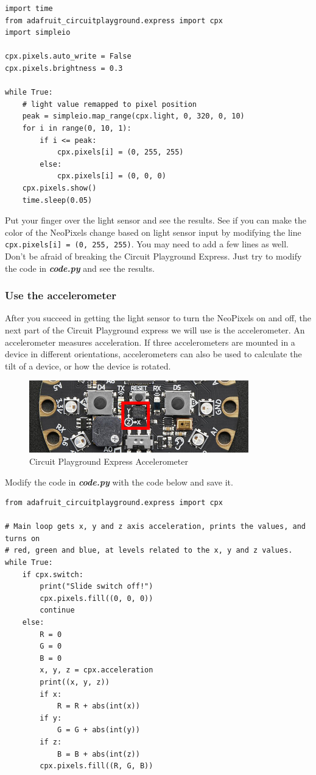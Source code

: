 \documentclass[11pt]{article}
\makeatletter
\def\maxwidth{\ifdim\Gin@nat@width>\linewidth\linewidth
    \else\Gin@nat@width\fi}
\let\Oldincludegraphics\includegraphics
\renewcommand{\includegraphics}[1]{\Oldincludegraphics[width=.8\maxwidth]{#1}}
\makeatother
\begin{document}
\begin{verbatim}
import time
from adafruit_circuitplayground.express import cpx
import simpleio

cpx.pixels.auto_write = False
cpx.pixels.brightness = 0.3

while True:
    # light value remapped to pixel position
    peak = simpleio.map_range(cpx.light, 0, 320, 0, 10)
    for i in range(0, 10, 1):
        if i <= peak:
            cpx.pixels[i] = (0, 255, 255)
        else:
            cpx.pixels[i] = (0, 0, 0)
    cpx.pixels.show()
    time.sleep(0.05)
\end{verbatim}

Put your finger over the light sensor and see the results. See if you
can make the color of the NeoPixels change based on light sensor input
by modifying the line \texttt{cpx.pixels{[}i{]}\ =\ (0,\ 255,\ 255)}.
You may need to add a few lines as well. Don't be afraid of breaking the
Circuit Playground Express. Just try to modify the code in
\textbf{\emph{code.py}} and see the results.

    \hypertarget{use-the-accelerometer}{%
\subsubsection{Use the accelerometer}\label{use-the-accelerometer}}

After you succeed in getting the light sensor to turn the NeoPixels on
and off, the next part of the Circuit Playground express we will use is
the accelerometer. An accelerometer measures acceleration. If three
accelerometers are mounted in a device in different orientations,
accelerometers can also be used to calculate the tilt of a device, or
how the device is rotated.

\begin{figure}
\centering
\includegraphics{images/circuitpython_cpx_accelerometer.jpg}
\caption{Circuit Playground Express Accelerometer}
\end{figure}

Modify the code in \textbf{\emph{code.py}} with the code below and save
it.

\begin{verbatim}
from adafruit_circuitplayground.express import cpx

# Main loop gets x, y and z axis acceleration, prints the values, and turns on
# red, green and blue, at levels related to the x, y and z values.
while True:
    if cpx.switch:
        print("Slide switch off!")
        cpx.pixels.fill((0, 0, 0))
        continue
    else:
        R = 0
        G = 0
        B = 0
        x, y, z = cpx.acceleration
        print((x, y, z))
        if x:
            R = R + abs(int(x))
        if y:
            G = G + abs(int(y))
        if z:
            B = B + abs(int(z))
        cpx.pixels.fill((R, G, B))
\end{verbatim}
\end{document}
